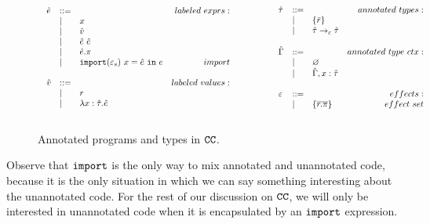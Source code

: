 \begin{figure}
\[
\begin{array}{lll}

\begin{array}{lllr}

\hat e & ::= & ~ & labeled~exprs: \\
	& | & x \\
	& | & \hat v \\
	& | & \hat e ~ \hat e \\
	& | & \hat e.\pi \\
	& | & \mathtt{import}(\varepsilon_s)~x = \hat e~\mathtt{in}~e & import \\
	&&\\

\hat v & ::= & ~ & labeled~values: \\
	& | & r \\
	& | & \lambda x: \hat \tau.\hat e \\
	&&\\

\end{array}

& ~~~~~~~~&

\begin{array}{lllr}

\hat \tau & ::= & ~ & annotated ~types: \\
		& | & \{ \bar r \} \\
		& | & \hat \tau \rightarrow_{\varepsilon} \hat \tau \\
		&&\\

\hat \Gamma & ::= & ~ & annotated~type~ctx:\\
				& | & \varnothing \\
				& | & \hat \Gamma, x: \hat \tau \\
				&&\\

\varepsilon & ::= & ~ & effects: \\
		& | & \{ \overline{r.\pi} \} & effect~set \\
		&&\\

\end{array}

\end{array}
\]
\caption{Annotated programs and types in $\mathtt{CC}$.}
\label{fig:epscalc_annotated_grammar}
\end{figure}

Observe that $\mathtt{import}$ is the only way to mix annotated and
unannotated code, because it is the only situation in which we can say
something interesting about the unannotated code. For the rest of our
discussion on $\mathtt{CC}$, we will only be interested in unannotated
code when it is encapsulated by an $\mathtt{import}$ expression.

